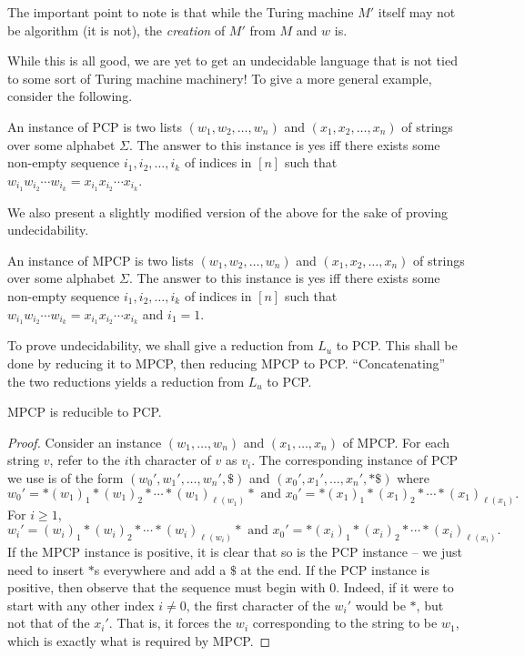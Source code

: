 	The important point to note is that while the Turing machine $M'$ itself may not be algorithm (it is not), the \emph{creation} of $M'$ from $M$ and $w$ is.

	While this is all good, we are yet to get an undecidable language that is not tied to some sort of Turing machine machinery! To give a more general example, consider the following.

	\begin{fprob}
		An instance of \textsf{PCP} is two lists $(w_1,w_2,\ldots,w_n)$ and $(x_1,x_2,\ldots,x_n)$ of strings over some alphabet $\Sigma$. The answer to this instance is yes iff there exists some non-empty sequence $i_1,i_2,\ldots,i_k$ of indices in $[n]$ such that $w_{i_1} w_{i_2} \cdots w_{i_k} = x_{i_1} x_{i_2} \cdots x_{i_k}$.
	\end{fprob}

	We also present a slightly modified version of the above for the sake of proving undecidability.

	\begin{problem*}
		An instance of \textsf{MPCP} is two lists $(w_1,w_2,\ldots,w_n)$ and $(x_1,x_2,\ldots,x_n)$ of strings over some alphabet $\Sigma$. The answer to this instance is yes iff there exists some non-empty sequence $i_1,i_2,\ldots,i_k$ of indices in $[n]$ such that $w_{i_1} w_{i_2} \cdots w_{i_k} = x_{i_1} x_{i_2} \cdots x_{i_k}$ and $i_1 = 1$.
	\end{problem*}

	To prove undecidability, we shall give a reduction from $L_u$ to \textsf{PCP}. This shall be done by reducing it to \textsf{MPCP}, then reducing \textsf{MPCP} to \textsf{PCP}. ``Concatenating'' the two reductions yields a reduction from $L_u$ to \textsf{PCP}.

	\begin{theorem}
		\textsf{MPCP} is reducible to \textsf{PCP}.
	\end{theorem}
	\begin{proof}
		Consider an instance $(w_1,\ldots,w_n)$ and $(x_1,\ldots,x_n)$ of \textsf{MPCP}. For each string $v$, refer to the $i$th character of $v$ as $v_i$. The corresponding instance of \textsf{PCP} we use is of the form $(w_0',w_1',\ldots,w_n',\$)$ and $(x_0',x_1',\ldots,x_n',*\$)$ where
		\[ w_0' = *(w_1)_1*(w_1)_2*\cdots*(w_1)_{\ell(w_1)}* \text{ and } x_0' = *(x_1)_1*(x_1)_2*\cdots*(x_1)_{\ell(x_1)}. \]
		For $i \ge 1$,
		\[ w_i' = (w_i)_1*(w_i)_2*\cdots*(w_i)_{\ell(w_i)}* \text{ and } x_0' = *(x_i)_1*(x_i)_2*\cdots*(x_i)_{\ell(x_i)}. \]
		If the \textsf{MPCP} instance is positive, it is clear that so is the \textsf{PCP} instance -- we just need to insert $*$s everywhere and add a $\$$ at the end. If the \textsf{PCP} instance is positive, then observe that the sequence must begin with $0$. Indeed, if it were to start with any other index $i \ne 0$, the first character of the $w_i'$ would be $*$, but not that of the $x_i'$. That is, it forces the $w_i$ corresponding to the string to be $w_1$, which is exactly what is required by \textsf{MPCP}.
	\end{proof}

